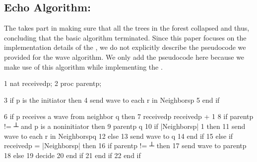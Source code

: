 \documentclass[letterpaper,10pt,english]{sphinxmanual}
\begin{document}
\subsection{Echo Algorithm:}
\label{\detokenize{docs/ShavitFrancez/algorithm:echo-algorithm}}
\sphinxAtStartPar
The {\hyperref[\detokenize{docs/ShavitFrancez/algorithm:echoalgorithm}]{}}  takes part in making sure that all the trees in the forest collapsed and thus, concluding that the basic algorithm terminated. Since this paper focuses on the implementation details of the {\hyperref[\detokenize{docs/ShavitFrancez/algorithm:shavitfrancezterminationdetectionalgorithm}]{}}, we do not explicitly describe the pseudocode we provided for the wave algorithm. We only add the pseudocode here because we make use of this algorithm while implementing the {\hyperref[\detokenize{docs/ShavitFrancez/algorithm:shavitfrancezterminationdetectionalgorithm}]{}}.
\def\sphinxLiteralBlockLabel{\label{\detokenize{docs/ShavitFrancez/algorithm:id13}}\label{\detokenize{docs/ShavitFrancez/algorithm:echoalgorithm}}}
\begin{sphinxVerbatim}[commandchars=\\\{\},numbers=left,firstnumber=1,stepnumber=1]
1   nat received\PYGZlt{}p\PYGZgt{};
2   proc parent\PYGZlt{}p\PYGZgt{};

3   if p is the initiator then
4       send \PYGZlt{}wave\PYGZgt{} to each r in Neighbors\PYGZlt{}p\PYGZgt{}
5   end if

6   if p receives a \PYGZlt{}wave\PYGZgt{} from neighbor q then
7       received\PYGZlt{}p\PYGZgt{} \PYGZlt{}\PYGZhy{} received\PYGZlt{}p\PYGZgt{} + 1
8       if parent\PYGZlt{}p\PYGZgt{} != ┴ and p is a non\PYGZhy{}initiator then
9           parent\PYGZlt{}p\PYGZgt{} \PYGZlt{}\PYGZhy{} q
10          if |Neighbors\PYGZlt{}p\PYGZgt{}| \PYGZgt{} 1 then
11              send \PYGZlt{}wave\PYGZgt{} to each r in Neighbors\PYGZlt{}p\PYGZgt{}\PYGZbs{}\PYGZob{}q\PYGZcb{}
12          else
13              send \PYGZlt{}wave\PYGZgt{} to q
14          end if
15      else if received\PYGZlt{}p\PYGZgt{} = |Neighbors\PYGZlt{}p\PYGZgt{}| then
16          if parent\PYGZlt{}p\PYGZgt{} != ┴ then
17              send \PYGZlt{}wave\PYGZgt{} to parent\PYGZlt{}p\PYGZgt{}
18          else
19              decide
20          end if
21      end if
22  end if
\end{sphinxVerbatim}
\end{document}
